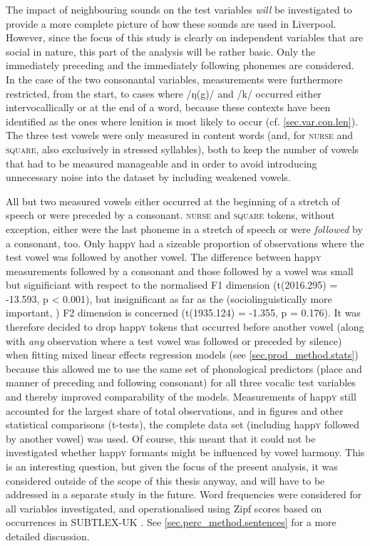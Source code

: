The impact of neighbouring sounds on the test variables \emph{will} be investigated to provide a more complete picture of how these sounds are used in Liverpool.
However, since the focus of this study is clearly on independent variables that are social in nature, this part of the analysis will be rather basic.
Only the immediately preceding and the immediately following phonemes are considered.
In the case of the two consonantal variables, measurements were furthermore restricted, from the start, to cases where /ŋ(g)/ and /k/ occurred either intervocallically or at the end of a word, because these contexts have been identified as the ones where lenition is most likely to occur (cf. \ref{sec.var.con.len}).
The three test vowels were only measured in content words (and, for \textsc{nurse} and \textsc{square}, also exclusively in stressed syllables), both to keep the number of vowels that had to be measured manageable and in order to avoid introducing unnecessary noise into the dataset by including weakened vowels.

All but two measured vowels either occurred at the beginning of a stretch of speech or were preceded by a consonant.
\textsc{nurse} and \textsc{square} tokens, without exception, either were the last phoneme in a stretch of speech or were \emph{followed} by a consonant, too.
Only happ\textsc{y} had a sizeable proportion of observations where the test vowel was followed by another vowel.
The difference between happ\textsc{y} measurements followed by a consonant and those followed by a vowel was small but significiant with respect to the normalised F1 dimension (t(2016.295) = -13.593, p < 0.001), but insignificant as far as the (sociolinguistically more important, \citealt[cf.][502]{labov2006a}) F2 dimension is concerned (t(1935.124) = -1.355, p = 0.176).
It was therefore decided to drop happ\textsc{y} tokens that occurred before another vowel (along with \emph{any} observation where a test vowel was followed or preceded by silence) when fitting mixed linear effects regression models (see \ref{sec.prod_method.stats}) because this allowed me to use the same set of phonological predictors (place and manner of preceding and following consonant) for all three vocalic test variables and thereby improved comparability of the models.
Measurements of happ\textsc{y} still accounted for the largest share of total observations, and in figures and other statistical comparisons (t-tests), the complete data set (including happ\textsc{y} followed by another vowel) was used.
Of course, this meant that it could not be investigated whether happ\textsc{y} formants might be influenced by vowel harmony.
This is an interesting question, but given the focus of the present analysis, it was considered outside of the scope of this thesis anyway, and will have to be addressed in a separate study in the future.
Word frequencies were considered for all variables investigated, and operationalised using Zipf scores based on occurrences in SUBTLEX-UK \parencite{heuvenetal2014}.
See \ref{sec.perc_method.sentences} for a more detailed discussion.

